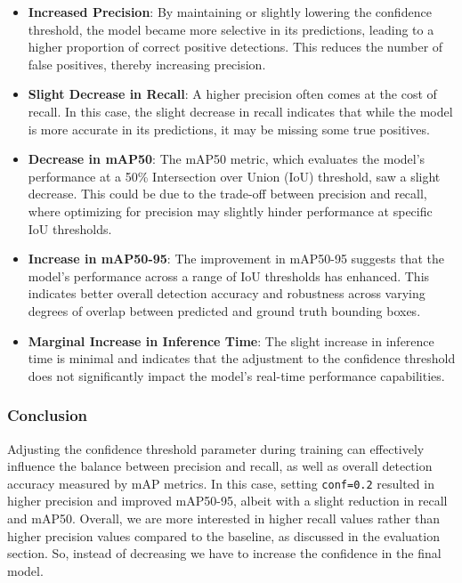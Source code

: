 \documentclass[conference]{IEEEtran}
\begin{document}
\begin{itemize}
    \item \textbf{Increased Precision}: By maintaining or slightly lowering the confidence threshold, the model became more selective in its predictions, leading to a higher proportion of correct positive detections. This reduces the number of false positives, thereby increasing precision.
    
    \item \textbf{Slight Decrease in Recall}: A higher precision often comes at the cost of recall. In this case, the slight decrease in recall indicates that while the model is more accurate in its predictions, it may be missing some true positives.
    
    \item \textbf{Decrease in mAP50}: The mAP50 metric, which evaluates the model's performance at a 50\% Intersection over Union (IoU) threshold, saw a slight decrease. This could be due to the trade-off between precision and recall, where optimizing for precision may slightly hinder performance at specific IoU thresholds.
    
    \item \textbf{Increase in mAP50-95}: The improvement in mAP50-95 suggests that the model's performance across a range of IoU thresholds has enhanced. This indicates better overall detection accuracy and robustness across varying degrees of overlap between predicted and ground truth bounding boxes.
    
    \item \textbf{Marginal Increase in Inference Time}: The slight increase in inference time is minimal and indicates that the adjustment to the confidence threshold does not significantly impact the model's real-time performance capabilities.
\end{itemize}


\subsubsection{Conclusion}
Adjusting the confidence threshold parameter during training can effectively influence the balance between precision and recall, as well as overall detection accuracy measured by mAP metrics. In this case, setting \texttt{conf=0.2} resulted in higher precision and improved mAP50-95, albeit with a slight reduction in recall and mAP50.
Overall, we are more interested in higher recall values rather than higher precision values compared to the baseline, as discussed in the evaluation section. So, instead of decreasing we have to increase the confidence in the final model.
\end{document}
